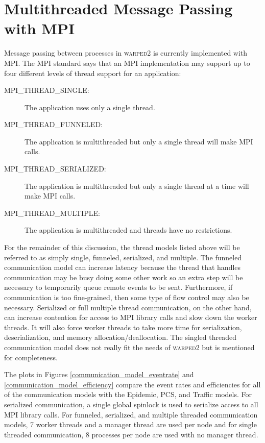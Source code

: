 \documentclass[11pt]{book}
\begin{document}
\section{Multithreaded Message Passing with MPI}

Message passing between processes in \textsc{warped2} is currently implemented with MPI.  The MPI
standard says that an MPI implementation may support up to four different levels of thread support
for an application:

\begin{description}
    \item[MPI\_THREAD\_SINGLE:] The application uses only a single thread.
    \item[MPI\_THREAD\_FUNNELED:] The application is multithreaded but only a single thread will
      make MPI calls.
    \item[MPI\_THREAD\_SERIALIZED:] The application is multithreaded but only a single thread at a
      time will make MPI calls.
    \item[MPI\_THREAD\_MULTIPLE:] The application is multithreaded and threads have no restrictions.
\end{description}

For the remainder of this discussion, the thread models listed above will be referred to as simply
single, funneled, serialized, and multiple.  The funneled communication model can increase latency
because the thread that handles communication may be busy doing some other work so an extra step
will be necessary to temporarily queue remote events to be sent.  Furthermore, if communication is
too fine-grained, then some type of flow control may also be necessary.  Serialized or full multiple
thread communication, on the other hand, can increase contention for access to MPI library calls and
slow down the worker threads.  It will also force worker threads to take more time for
serialization, deserialization, and memory allocation/deallocation.  The singled threaded
communication model does not really fit the needs of \textsc{warped2} but is mentioned for
completeness.

The plots in Figures \ref{communication_model_eventrate} and \ref{communication_model_efficiency}
compare the event rates and efficiencies for all of the communication models with the Epidemic, PCS,
and Traffic models.  For serialized communication, a single global spinlock is used to serialize
access to all MPI library calls.  For funneled, serialized, and multiple threaded communication
models, 7 worker threads and a manager thread are used per node and for single threaded
communication, 8 processes per node are used with no manager thread.
\end{document}
